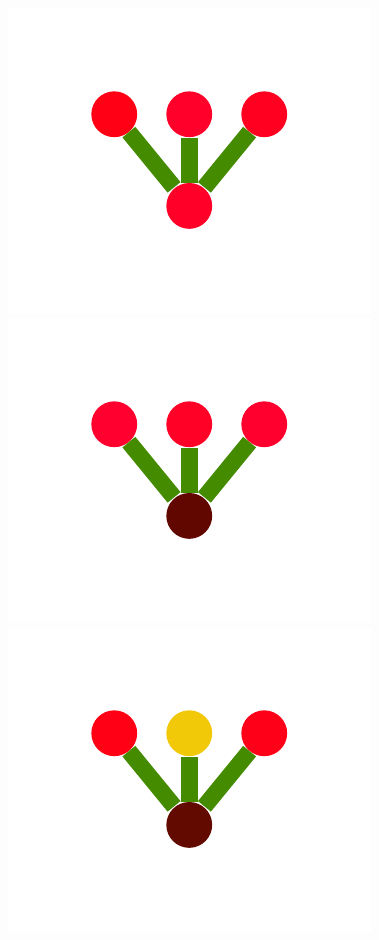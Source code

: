 \documentclass[a4paper,10pt]{article}
\begin{document}
\begin{figure}
{    \includegraphics[scale=.26]{../figures/vector/4-2-2-mergeprog-good-3.pdf}
    \includegraphics[scale=.26]{../figures/vector/4-2-2-mergeprog-good-4.pdf}
    \includegraphics[scale=.26]{../figures/vector/4-2-2-mergeprog-good-5.pdf}
}
\end{figure}
\end{document}
